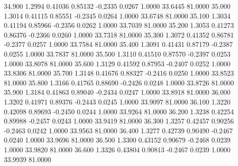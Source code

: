   34.900   1.2994   0.41036   0.85132  -0.2335   0.0267   1.0000  33.6445  81.0000
  35.000   1.3014   0.41115   0.85551  -0.2345   0.0264   1.0000  33.6748  81.0000
  35.100   1.3034   0.41194   0.85966  -0.2356   0.0262   1.0000  33.7039  81.0000
  35.200   1.3053   0.41273   0.86376  -0.2366   0.0260   1.0000  33.7318  81.0000
  35.300   1.3072   0.41352   0.86781  -0.2377   0.0257   1.0000  33.7584  81.0000
  35.400   1.3091   0.41431   0.87179  -0.2387   0.0255   1.0000  33.7837  81.0000
  35.500   1.3110   0.41510   0.87570  -0.2397   0.0253   1.0000  33.8078  81.0000
  35.600   1.3129   0.41592   0.87953  -0.2407   0.0252   1.0000  33.8306  81.0000
  35.700   1.3148   0.41676   0.88327  -0.2416   0.0250   1.0000  33.8523  81.0000
  35.800   1.3166   0.41765   0.88690  -0.2426   0.0248   1.0000  33.8726  81.0000
  35.900   1.3184   0.41863   0.89040  -0.2434   0.0247   1.0000  33.8918  81.0000
  36.000   1.3202   0.41971   0.89376  -0.2443   0.0245   1.0000  33.9097  81.0000
  36.100   1.3220   0.42098   0.89693  -0.2450   0.0244   1.0000  33.9264  81.0000
  36.200   1.3238   0.42254   0.89988  -0.2457   0.0243   1.0000  33.9419  81.0000
  36.300   1.3257   0.42457   0.90256  -0.2463   0.0242   1.0000  33.9563  81.0000
  36.400   1.3277   0.42739   0.90490  -0.2467   0.0240   1.0000  33.9696  81.0000
  36.500   1.3300   0.43152   0.90679  -0.2468   0.0239   1.0000  33.9820  81.0000
  36.600   1.3326   0.43804   0.90813  -0.2467   0.0239   1.0000  33.9939  81.0000
